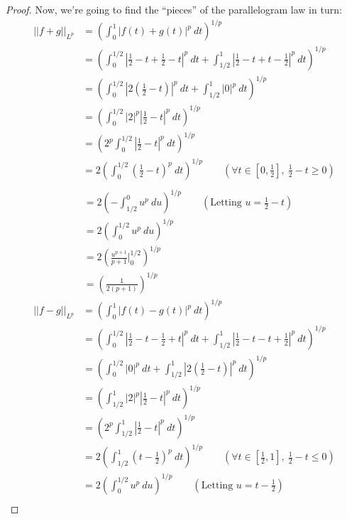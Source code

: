 \documentclass{article}
\newcommand{\norm}[1]{\left|\left|#1\right|\right|}
\newcommand{\abs}[1]{\left|#1\right|}
\newcommand{\parens}[1]{\left(#1\right)}
\newcommand{\sqbracks}[1]{\left[#1\right]}
\begin{document}
\begin{proof}
    Now, we're going to find the ``pieces'' of the parallelogram law in turn:\\
    \begin{align*}
    \norm{f+g}_{L^p} &= \parens{\int_0^1 \abs{f(t) + g(t)}^p\ dt}^{1/p} \\
    &= \parens{\int_0^{1/2} \abs{\frac{1}{2} -t + \frac{1}{2} - t}^p\ dt + 
    \int_{1/2}^1 \abs{\frac{1}{2} -t +t - \frac{1}{2}}^p\ dt}^{1/p} \\
    &= \parens{\int_0^{1/2} \abs{2\parens{\frac{1}{2} -t}}^p\ dt + 
    \int_{1/2}^1 \abs{0}^p\ dt}^{1/p} \\
    &= \parens{\int_0^{1/2} \abs{2}^p\abs{\frac{1}{2} -t}^p\ dt}^{1/p} \\
    &= \parens{2^p\int_0^{1/2} \abs{\frac{1}{2} -t}^p\ dt}^{1/p} \\
    &= 2\parens{\int_0^{1/2} \parens{\frac{1}{2} -t}^p\ dt}^{1/p} \qquad 
    \parens{\forall t \in \sqbracks{0, \frac{1}{2}},\ \frac{1}{2}- t \geq 0}\\
    \end{align*}
    \begin{align*}
    &= 2\parens{-\int_{1/2}^0 u^p\ du}^{1/p} \qquad 
    \parens{\text{Letting } u = \frac{1}{2} - t} \\
    &= 2\parens{\int_0^{1/2} u^p\ du}^{1/p} \\ 
    &= 2\parens{\frac{u^{p+1}}{p+1}\Bigg|_0^{1/2}}^{1/p} \\ 
    &= \parens{\frac{1}{2(p+1)}}^{1/p}
    \end{align*}
    \begin{align*}
    \norm{f-g}_{L^p} &= \parens{\int_0^1 \abs{f(t) - g(t)}^p\ dt}^{1/p} \\
    &= \parens{\int_0^{1/2} \abs{\frac{1}{2} -t - \frac{1}{2} + t}^p\ dt + 
    \int_{1/2}^1 \abs{\frac{1}{2} -t -t + \frac{1}{2}}^p\ dt}^{1/p} \\
    &= \parens{\int_0^{1/2} \abs{0}^p\ dt + 
    \int_{1/2}^1 \abs{2\parens{\frac{1}{2} -t}}^p\ dt}^{1/p} \\
    &= \parens{\int_{1/2}^1 \abs{2}^p\abs{\frac{1}{2} -t}^p\ dt}^{1/p} \\
    &= \parens{2^p\int_{1/2}^1 \abs{\frac{1}{2} -t}^p\ dt}^{1/p} \\
    &= 2\parens{\int_{1/2}^1 \parens{t-\frac{1}{2}}^p\ dt}^{1/p} \qquad 
    \parens{\forall t \in \sqbracks{\frac{1}{2}, 1},\ \frac{1}{2}- t \leq 0}\\
    &= 2\parens{\int_0^{1/2} u^p\ du}^{1/p} \qquad 
    \parens{\text{Letting } u = t - \frac{1}{2}} \\

\end{align*}
\end{proof}
\end{document}
